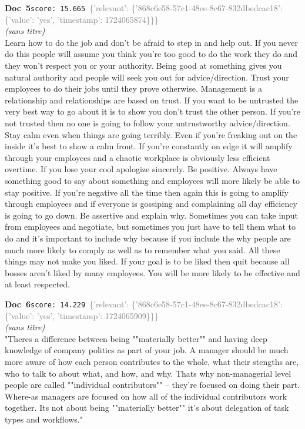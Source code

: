 \documentclass[a4paper,11pt]{article}
\begin{document}
\begin{docenv}
{\footnotesize\textcolor{doccolor}{\textbf{Doc~5}}}\hfill{\tiny\texttt{score:~15.665}}\ {\tiny\textcolor{gray}{\{'relevant': \{'868c6e58-57c1-48ee-8c67-832dbedcac18': \{'value': 'yes', 'timestamp': 1724065874\}\}\}}}\\[3pt]
{\small\textit{(sans titre)}}\\[2pt]
\vspace{2pt}
{\footnotesize 
Learn how to do the job and don't be afraid to step in and help out. If you never do this people will assume you think you're too good to do the work they do and they won't respect you or your authority.   Being good at something gives you natural authority and people will seek you out for advice/direction.  Trust your employees to do their jobs until they prove otherwise. Management is a relationship and relationships are based on trust. If you want to be untrusted the very best way to go about it is to show you don't trust the other person. If you're not trusted then no one is going to follow your untrustworthy advice/direction.  Stay calm even when things are going terribly. Even if you're freaking out on the inside it's best to show a calm front. If you're constantly on edge it will amplify through your employees and a chaotic workplace is obviously less efficient overtime. If you lose your cool apologize sincerely.  Be positive. Always have something good to say about something and employees will more likely be able to stay positive. If you're negative all the time then again this is going to amplify through employees and if everyone is gossiping and complaining all day efficiency is going to go down.   Be assertive and explain why. Sometimes you can take input from employees and negotiate, but sometimes you just have to tell them what to do and it's important to include why because if you include the why people are much more likely to comply as well as to remember what you said.  All these things may not make you liked. If your goal is to be liked then quit because all bosses aren't liked by many employees. You will be more likely to be effective and at least respected.}
\end{docenv}
\begin{docenv}
{\footnotesize\textcolor{doccolor}{\textbf{Doc~6}}}\hfill{\tiny\texttt{score:~14.229}}\ {\tiny\textcolor{gray}{\{'relevant': \{'868c6e58-57c1-48ee-8c67-832dbedcac18': \{'value': 'yes', 'timestamp': 1724065909\}\}\}}}\\[3pt]
{\small\textit{(sans titre)}}\\[2pt]
\vspace{2pt}
{\footnotesize 
"Theres a difference between being ""materially better"" and having deep knowledge of company politics as part of your job.   A manager should be much more aware of how each person contributes to the whole, what their stengths are, who to talk to about what, and how, and why. Thats why non-managerial level people are called ""individual contributors"" -- they're focused on doing their part. Where-as managers are focused on how all of the individual contributors work together.  Its not about being ""materially better"" it's about delegation of task types and workflows."}
\end{docenv}
\end{document}
